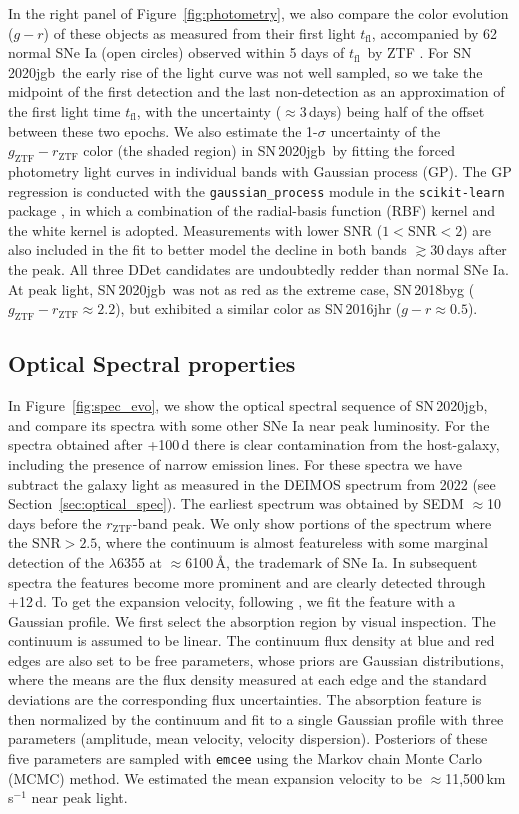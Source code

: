 \documentclass[twocolumn]{aastex631}
\newcommand{\sn}{SN\,2020jgb}
\newcommand{\tfl}{$t_\mathrm{fl}$}
\begin{document}
In the right panel of Figure~\ref{fig:photometry}, we also compare the color evolution ($g-r$) of these objects as measured from their first light \tfl, accompanied by 62 normal SNe Ia (open circles) observed within 5 days of \tfl\ by ZTF \citep[from][]{Bulla2020}. For \sn\, the early rise of the light curve was not well sampled, so we take the midpoint of the first detection and the last non-detection as an approximation of the first light time \tfl, with the uncertainty ($\approx$3\,days) being half of the offset between these two epochs. We also estimate the 1-$\sigma$ uncertainty of the $g_\mathrm{ZTF}-r_\mathrm{ZTF}$ color (the shaded region) in \sn\ by fitting the forced photometry light curves in individual bands with Gaussian process (GP). The GP regression is conducted with the \texttt{gaussian\_process} module in the \texttt{scikit-learn} package \citep{scikit-learn}, in which a combination of the radial-basis function (RBF) kernel and the white kernel is adopted. Measurements with lower SNR ($1<\mathrm{SNR}<2$) are also included in the fit to better model the decline in both bands $\gtrsim$30\,days after the peak. All three DDet candidates are undoubtedly redder than normal SNe Ia. At peak light, \sn\ was not as red as the extreme case, SN\,2018byg ($g_\mathrm{ZTF}-r_\mathrm{ZTF}\approx2.2$), but exhibited a similar color as SN\,2016jhr ($g-r\approx0.5$).

\subsection{Optical Spectral properties}
In Figure~\ref{fig:spec_evo}, we show the optical spectral sequence of \sn, and compare its spectra with some other SNe Ia near peak luminosity. For the spectra obtained after +100\,d there is clear contamination from the host-galaxy, including the presence of narrow emission lines. For these spectra we have subtract the galaxy light as measured in the DEIMOS spectrum from 2022 (see Section~\ref{sec:optical_spec}). The earliest spectrum was obtained by SEDM $\approx$10\,days before the $r_\mathrm{ZTF}$-band peak. We only show portions of the spectrum where the $\mathrm{SNR}>2.5$, where the continuum is almost featureless with some marginal detection of the  $\lambda$6355 at $\approx$6100\,\r{A}, the trademark of SNe Ia. In subsequent spectra the  features become more prominent and are clearly detected through +12\,d. To get the expansion velocity, following \citet{Maguire_2014}, we fit the  feature with a Gaussian profile. We first select the absorption region by visual inspection. The continuum is assumed to be linear. The continuum flux density at blue and red edges are also set to be free parameters, whose priors are Gaussian distributions, where the means are the flux density measured at each edge and the standard deviations are the corresponding flux uncertainties. The absorption feature is then normalized by the continuum and fit to a single Gaussian profile with three parameters (amplitude, mean velocity, velocity dispersion). Posteriors of these five parameters are sampled with \texttt{emcee} \citep{emcee_2013} using the Markov chain Monte Carlo (MCMC) method. We estimated the mean expansion velocity to be $\approx$11,500\,km\,s$^{-1}$ near peak light.
\end{document}

